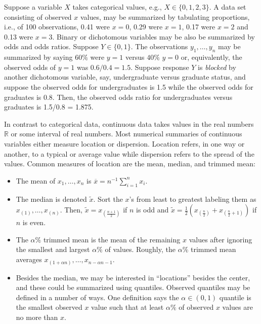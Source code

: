 \documentclass[
]{book}
\providecommand{\tightlist}{%
  \setlength{\itemsep}{0pt}\setlength{\parskip}{0pt}}
\begin{document}
Suppose a variable \(X\) takes categorical values, e.g., \(X\in\{0,1,2,3\}\). A data set consisting of observed \(x\) values, may be summarized by tabulating proportions, i.e., of 100 observations, 0.41 were \(x=0\), 0.29 were \(x = 1\), 0.17 were \(x = 2\) and 0.13 were \(x=3\). Binary or dichotomous variables may be also be summarized by odds and odds ratios. Suppose \(Y\in\{0,1\}\). The observations \(y_1, \ldots, y_n\) may be summarized by saying \(60\%\) were \(y=1\) versus \(40\%\) \(y=0\) or, equivalently, the observed odds of \(y=1\) was \(0.6/0.4 = 1.5\). Suppose response \(Y\) is \emph{blocked} by another dichotomous variable, say, undergraduate versus graduate status, and suppose the observed odds for undergraduates is 1.5 while the observed odds for graduates is 0.8. Then, the observed odds ratio for undergraduates versus graduates is 1.5/0.8 = 1.875.

In contrast to categorical data, continuous data takes values in the real numbers \(\mathbb{R}\) or some interval of real numbers. Most numerical summaries of continuous variables either measure location or dispersion. Location refers, in one way or another, to a typical or average value while dispersion refers to the spread of the values. Common measures of location are the mean, median, and trimmed mean:

\begin{itemize}
\tightlist
\item
  The mean of \(x_1, \ldots, x_n\) is \(\overline x = n^{-1}\sum_{i=1}^n x_i\).
\item
  The median is denoted \(\tilde x\). Sort the \(x\)'s from least to greatest labeling them as \(x_{(1)}, \ldots, x_{(n)}\). Then, \(\tilde x = x_{(\frac{n+1}{2})}\) if \(n\) is odd and \(\tilde x = \tfrac12\left(x_{(\frac{n}{2})} + x_{(\frac{n}{2}+1)}\right)\) if \(n\) is even.
\item
  The \(\alpha\%\) trimmed mean is the mean of the remaining \(x\) values after ignoring the smallest and largest \(\alpha\%\) of values. Roughly, the \(\alpha\%\) trimmed mean averages \(x_{(1+\alpha n)},\ldots, x_{n - \alpha n - 1}\).
\item
  Besides the median, we may be interested in ``locations'' besides the center, and these could be summarized using quantiles. Observed quantiles may be defined in a number of ways. One definition says the \(\alpha\in(0,1)\) quantile is the smallest observed \(x\) value such that at least \(\alpha\%\) of observed \(x\) values are no more than \(x\).
\end{itemize}
\end{document}

